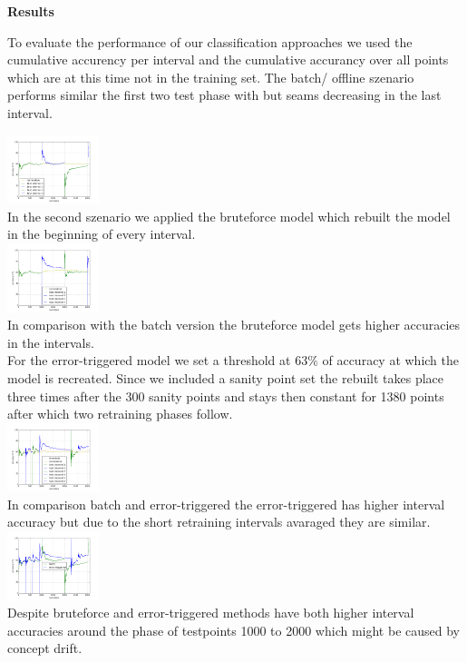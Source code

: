 \begin{center} \textbf{\huge Results} \end{center}
To evaluate the performance of our classification approaches we used the cumulative accurency per interval and the cumulative accurancy over all points which are at this time not in the training set. The batch/ offline szenario performs similar the first two test phase with but seams decreasing in the last interval.

 \includegraphics[width=0.2\textwidth]{./plots/batchPlot.png}\\

In the second szenario we applied the bruteforce model which rebuilt the model in the beginning of every interval.\\
   \includegraphics[width=0.2\textwidth]{./plots/bruteforce2_Plot.png}\\
In comparison with the batch version the bruteforce model gets higher accuracies in the intervals.\\

For the error-triggered model we set a threshold at 63\% of accuracy at which the model is recreated. Since we included a sanity point set the rebuilt takes place three times after the 300 sanity points and stays then constant for 1380 points after which two retraining phases follow.\\
   \includegraphics[width=0.2\textwidth]{./plots/errorTriggeredPlot}\\
In comparison batch and error-triggered the error-triggered has higher interval accuracy but due to the short retraining intervals avaraged they are similar. \\

\includegraphics[width=0.2\textwidth]{./plots/errortriggered_batch}\\
Despite bruteforce and error-triggered methods have both higher interval accuracies around the phase of testpoints 1000 to 2000 which might be caused by concept drift. 
\\

